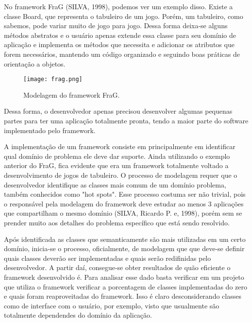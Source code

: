 \documentclass[
    12pt,       %
    openright,      %
    twoside,      %
    a4paper,      %
    english,      %
    french,       %
    spanish,      %
    brazil,       %
    ]{abntex2}
\begin{document}
          No framework FraG (SILVA, 1998), podemos ver um exemplo disso. Existe
          a classe Board, que representa o tabuleiro de um jogo. Porém, um
          tabuleiro, como sabemos, pode variar muito de jogo para jogo. Dessa
          forma deixa-se alguns métodos abstratos e o usuário apenas extende
          essa classe para seu domínio de aplicação e implementa os métodos que
          necessita e adicionar os atributos que forem necessários, mantendo
          um código organizado e seguindo boas práticas de orientação a objetos.

          \begin{figure}[htbp]
              \begin{center}
                  \texttt{[image: frag.png]}
              \end{center}
              \caption{\label{fig:passaro}Modelagem do framework FraG.}
          \end{figure}

          Dessa forma, o desenvolvedor apenas precisou desenvolver algumas pequenas
          partes para ter uma aplicação totalmente pronta, tendo a maior parte
          do software implementado pelo framework.

          A implementação de um framework consiste em principalmente em identificar
          qual domínio de problema ele deve dar suporte. Ainda utilizando o exemplo
          anterior do FraG, fica evidente que era um framework totalmente voltado a
          desenvolvimento de jogos de tabuleiro. O processo de modelagem
          requer que o desenvolvedor identifique as classes mais comum de um domínio
          problema, também conhecidos como "hot spots". Esse processo costuma ser
          não trivial, pois o responsável pela modelagem do framework deve estudar
          ao menos 3 aplicações que compartilham o mesmo domínio (SILVA, Ricardo P. e, 1998), porém sem se prender muito aos detalhes do problema específico que
          está sendo resolvido.

          Após identificada as classes que semanticamente são mais utilizadas em um
          certo domínio, inicia-se o processo, oficialmente, de modelagem que
          que deve-se definir quais classes deverão ser implementadas e quais serão
          redifinidas pelo desenvolvedor. A partir daí, consegue-se obter resultados
          de quão eficiente o framework desenvolvido é. Para analisar esse dado
          basta verificar em um projeto que utiliza o framework verificar a porcentagem
          de classes implementadas do zero e quais foram reaproveitadas do framework.
          Isso é claro desconsiderando classes como de interface com o usuário, por
          exemplo, visto que usualmente são totalmente dependendes do domínio da aplicação.
\end{document}

